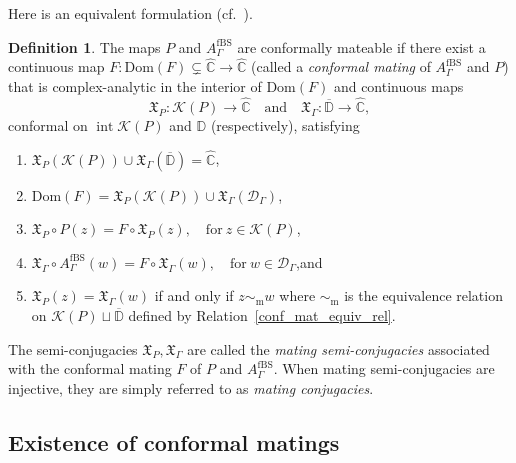 \documentclass[10pt,a4paper]{amsart}
\newcommand{\cf}{cf.\ }
\theoremstyle{definition}
\newtheorem{definition}[lemma]{Definition}
\theoremstyle{remark}
\newcommand{\C}{\mathbb{C}}
\newcommand{\D}{\mathbb{D}}
\DeclareMathOperator{\Int}{int}
\begin{document}
Here is an equivalent formulation (\cf \cite[Def.\,4.14]{petersen-meyer-mating}).
\begin{definition}\label{conf_mat_def}
The maps $P$ and $A_{\Gamma}^{\mathrm{fBS}}$ are conformally mateable if there exist a continuous map $F\colon \mathrm{Dom}(F)\subsetneq\widehat{\C}\to\widehat{\C}$ (called a \emph{conformal mating} of $A_{\Gamma}^{\mathrm{fBS}}$ and $P$) that is complex-analytic in the interior of $\mathrm{Dom}(F)$ and continuous maps\vspace*{-3pt}
\[
\mathfrak{X}_P:\mathcal{K}(P)\to\widehat{\C}\quad \text{and}\quad \mathfrak{X}_\Gamma: \overline{\D}\to\widehat{\C},
\]
conformal on $\Int{\mathcal{K}(P)}$ and $\D$ (respectively), satisfying
\begin{enumerate}
\item\label{topo_cond} $\mathfrak{X}_P\left(\mathcal{K}(P)\right)\cup \mathfrak{X}_\Gamma\left(\overline{\D}\right) = \widehat{\C}$,

\item\label{dom_cond} $\mathrm{Dom}(F)= \mathfrak{X}_P(\mathcal{K}(P))\cup\mathfrak{X}_\Gamma(\mathcal{D}_{\Gamma})$,

\item $\mathfrak{X}_P\circ P(z) = F\circ \mathfrak{X}_P(z),\quad \mathrm{for}\ z\in\mathcal{K}(P)$,

\item $\mathfrak{X}_\Gamma\circ A_{\Gamma}^{\mathrm{fBS}}(w) = F\circ \mathfrak{X}_\Gamma(w),\quad \mathrm{for}\ w\in
\mathcal{D}_{\Gamma}$,\quad and

\item\label{identifications} $\mathfrak{X}_P(z)=\mathfrak{X}_\Gamma(w)$ if and only if $z\sim_{\mathrm{m}} w$ where $\sim_{\mathrm{m}}$ is the equivalence relation on $\mathcal{K}(P)\sqcup \overline{\D}$ defined by Relation~\eqref{conf_mat_equiv_rel}.
\end{enumerate}
The semi-conjugacies $\mathfrak{X}_P, \mathfrak{X}_\Gamma$ are called the \emph{mating semi-conjugacies} associated with the conformal mating $F$ of $P$ and $A_{\Gamma}^{\mathrm{fBS}}$. When mating semi-conjugacies are injective, they are simply referred to as \emph{mating conjugacies}.
\end{definition}

\subsection{Existence of conformal matings}\label{conf_mat_exists_subsec}
\end{document}
